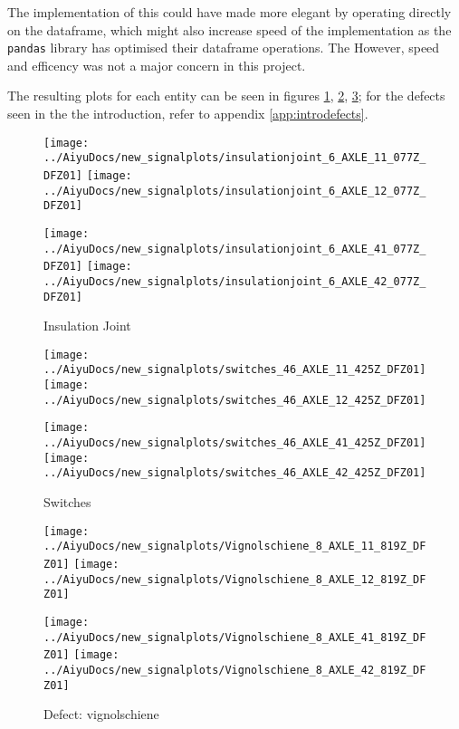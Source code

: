 The implementation of this could have made more elegant by operating directly on the dataframe, which might also increase speed of the implementation as the \verb|pandas| library has optimised their dataframe operations. The However, speed and efficency was not a major concern in this project. 

The resulting plots for each entity can be seen in figures \ref{fig:insjoint}, \ref{fig:switches}, \ref{fig:defects}; for the defects seen in the the introduction, refer to appendix \ref{app:introdefects}.
\begin{figure}[H]
	\centering
	\texttt{[image: ../AiyuDocs/new\_signalplots/insulationjoint\_6\_AXLE\_11\_077Z\_DFZ01]}
	\texttt{[image: ../AiyuDocs/new\_signalplots/insulationjoint\_6\_AXLE\_12\_077Z\_DFZ01]}
	
	\texttt{[image: ../AiyuDocs/new\_signalplots/insulationjoint\_6\_AXLE\_41\_077Z\_DFZ01]}
	\texttt{[image: ../AiyuDocs/new\_signalplots/insulationjoint\_6\_AXLE\_42\_077Z\_DFZ01]}
	\caption{Insulation Joint}
	\label{fig:insjoint}
\end{figure}

\begin{figure}[H]
	\centering
	\texttt{[image: ../AiyuDocs/new\_signalplots/switches\_46\_AXLE\_11\_425Z\_DFZ01]}
	\texttt{[image: ../AiyuDocs/new\_signalplots/switches\_46\_AXLE\_12\_425Z\_DFZ01]}
	
	\texttt{[image: ../AiyuDocs/new\_signalplots/switches\_46\_AXLE\_41\_425Z\_DFZ01]}
	\texttt{[image: ../AiyuDocs/new\_signalplots/switches\_46\_AXLE\_42\_425Z\_DFZ01]}
	\caption{Switches}
	\label{fig:switches}
\end{figure}

\begin{figure}[H]
	\centering
	\texttt{[image: ../AiyuDocs/new\_signalplots/Vignolschiene\_8\_AXLE\_11\_819Z\_DFZ01]}
	\texttt{[image: ../AiyuDocs/new\_signalplots/Vignolschiene\_8\_AXLE\_12\_819Z\_DFZ01]}
	
	\texttt{[image: ../AiyuDocs/new\_signalplots/Vignolschiene\_8\_AXLE\_41\_819Z\_DFZ01]}
	\texttt{[image: ../AiyuDocs/new\_signalplots/Vignolschiene\_8\_AXLE\_42\_819Z\_DFZ01]}
	\caption{Defect: vignolschiene}
	\label{fig:defects}
\end{figure}



